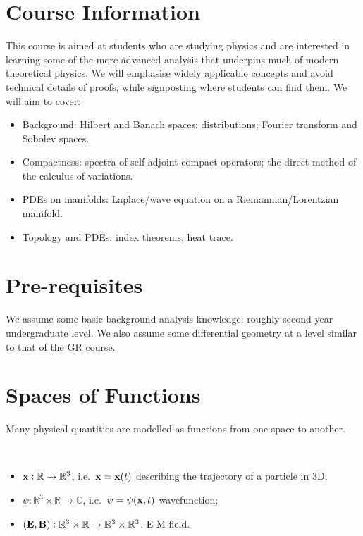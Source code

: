 \documentclass[a4paper,11pt]{article}
\begin{document}
	\maketitlepage
	\preliminaries

	\section*{Course Information}
	
	This course is aimed at students who are studying physics and are interested in learning some of the more advanced analysis that underpins much of modern theoretical physics. We will emphasise widely applicable concepts and avoid technical details of proofs, while signposting where students can find them. We will aim to cover:

	\begin{itemize}
		\item Background: Hilbert and Banach spaces; distributions; Fourier transform and Sobolev spaces.
	
		\item Compactness: spectra of self-adjoint compact operators; the direct method of the calculus of variations.
	
		\item PDEs on manifolds: Laplace/wave equation on a Riemannian/Lorentzian manifold.
	
		\item Topology and PDEs: index theorems, heat trace.
	\end{itemize}

	\section*{Pre-requisites}

	We assume some basic background analysis knowledge: roughly second year undergraduate level. We also assume some differential geometry at a level similar to that of the GR course.

	\newpage

	\tableofcontents
	\newpage
	\maintext

	\section{Spaces of Functions}

	Many physical quantities are modelled as functions from one space to another.

	\begin{ex}
		\ 
		\begin{itemize}
			\item $\vb x : \mathbb{R} \to \mathbb{R}^3$, i.e.\ $\vb x = \vb x(t)$ describing the trajectory of a particle in 3D;
			\item $\psi : \mathbb{R}^3 \times \mathbb{R} \to \mathbb{C}$, i.e.\ $\psi = \psi(\vb x, t)$ wavefunction;
			\item $(\vb E, \vb B) : \mathbb{R}^3 \times \mathbb{R} \to \mathbb{R}^3 \times \mathbb{R}^3$, E-M field.
		\end{itemize}
	\end{ex}
\end{document}
